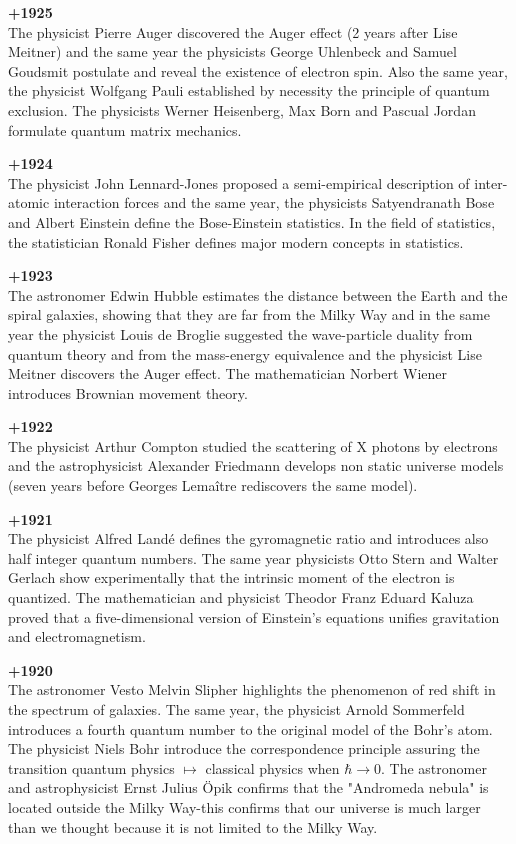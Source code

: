\textbf{+1925}\\
The physicist Pierre Auger discovered the Auger effect (2 years after Lise Meitner) and the same year the physicists George Uhlenbeck and Samuel Goudsmit postulate and reveal the existence of electron spin. Also the same year, the physicist Wolfgang Pauli established by necessity the principle of quantum exclusion. The physicists Werner Heisenberg, Max Born and Pascual Jordan formulate quantum matrix mechanics.

\textbf{+1924}\\
The physicist John Lennard-Jones proposed a semi-empirical description of inter-atomic interaction forces and the same year, the physicists Satyendranath Bose and Albert Einstein define the Bose-Einstein statistics. In the field of statistics, the statistician Ronald Fisher defines major modern concepts in statistics.

\textbf{+1923}\\
The astronomer Edwin Hubble estimates the distance between the Earth and the spiral galaxies, showing that they are far from the Milky Way and in the same year the physicist Louis de Broglie suggested the wave-particle duality from quantum theory and from the mass-energy equivalence and the physicist Lise Meitner discovers the Auger effect. The mathematician Norbert Wiener introduces Brownian movement theory.

\textbf{+1922}\\
The physicist Arthur Compton studied the scattering of X photons by electrons and the astrophysicist Alexander Friedmann develops non static universe models (seven years before Georges Lemaître rediscovers the same model).

\textbf{+1921}\\
The physicist Alfred Landé defines the gyromagnetic ratio and introduces also half integer quantum numbers. The same year physicists Otto Stern and Walter Gerlach show experimentally that the intrinsic moment of the electron is quantized. The mathematician and physicist Theodor Franz Eduard Kaluza proved that a five-dimensional version of Einstein's equations unifies gravitation and electromagnetism.

\textbf{+1920}\\
The astronomer Vesto Melvin Slipher highlights the phenomenon of red shift in the spectrum of galaxies. The same year, the physicist Arnold Sommerfeld introduces a fourth quantum number to the original model of the Bohr's atom. The physicist Niels Bohr introduce the correspondence principle assuring the transition quantum physics $\mapsto$ classical physics when $\hbar\rightarrow 0$. The astronomer and astrophysicist Ernst Julius Öpik confirms that the "Andromeda nebula" is located outside the Milky Way-this confirms that our universe is much larger than we thought because it is not limited to the Milky Way.

